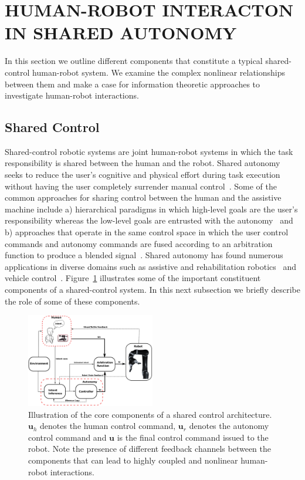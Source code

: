 \documentclass[letterpaper, 10 pt, conference]{ieeeconf}  %
\begin{document}
%

\section{HUMAN-ROBOT INTERACTON IN SHARED AUTONOMY}\label{sec:HRI}
In this section we outline different components that constitute a typical shared-control human-robot system. We examine the complex nonlinear relationships between them and make a case for information theoretic approaches to investigate human-robot interactions. 
\subsection{Shared Control}
Shared-control robotic systems are joint human-robot systems in which the task responsibility is shared between the human and the robot. Shared autonomy seeks to reduce the user's cognitive and physical effort during task execution without having the user completely surrender manual control~\cite{gopinath2017human}. Some of the common approaches for sharing control between the human and the assistive machine include a) hierarchical paradigms in which high-level goals are the user's responsibility whereas the low-level goals are entrusted with the autonomy~\cite{tsui2011want} and b) approaches that operate in the same control space in which the user control commands and autonomy commands are fused according to an arbitration function to produce a blended signal~\cite{dragan2013policy}. Shared autonomy has found numerous applications in diverse domains such as assistive and rehabilitation robotics~\cite{argall2013machine} and vehicle control~\cite{erlien2016shared}. 
Figure~\ref{fig:shared_control} illustrates some of the important constituent components of a shared-control system. In this next subsection we briefly describe the role of some of these components. 
\begin{figure}[t!]
	\includegraphics[keepaspectratio, width = 0.5\textwidth, center]{./figures/Fig1.eps}
	\caption{Illustration of the core components of a shared control architecture. $\boldsymbol{u}_h$ denotes the human control command, $\boldsymbol{u}_r$ denotes the autonomy control command and $\boldsymbol{u}$ is the final control command issued to the robot. Note the presence of different feedback channels between the components that can lead to highly coupled and nonlinear human-robot interactions. }
	\label{fig:shared_control}
\end{figure}
\end{document}
